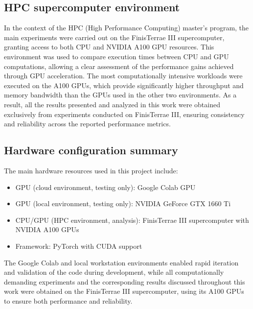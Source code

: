 \subsection{HPC supercomputer environment}
In the context of the HPC (High Performance Computing) master's program, the main experiments were carried out on the FinisTerrae III supercomputer, granting access to both CPU and NVIDIA A100 GPU resources. This environment was used to compare execution times between CPU and GPU computations, allowing a clear assessment of the performance gains achieved through GPU acceleration.
The most computationally intensive workloads were executed on the A100 GPUs, which provide significantly higher throughput and memory bandwidth than the GPUs used in the other two environments. As a result, all the results presented and analyzed in this work were obtained exclusively from experiments conducted on FinisTerrae III, ensuring consistency and reliability across the reported performance metrics.

\subsection{Hardware configuration summary}
The main hardware resources used in this project include:
\begin{itemize}
	\item GPU (cloud environment, testing only): Google Colab GPU
	\item GPU (local environment, testing only): NVIDIA GeForce GTX 1660 Ti
	\item CPU/GPU (HPC environment, analysis): FinisTerrae III supercomputer with NVIDIA A100 GPUs
	\item Framework: PyTorch with CUDA support
\end{itemize}

The Google Colab and local workstation environments enabled rapid iteration and validation of the code during development, while all computationally demanding experiments and the corresponding results discussed throughout this work were obtained on the FinisTerrae III supercomputer, using its A100 GPUs to ensure both performance and reliability.